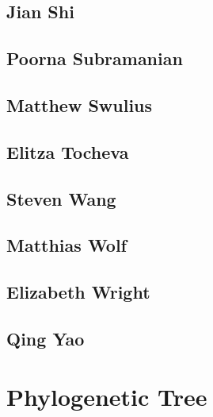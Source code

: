 \documentclass[]{tufte-book}
\begin{document}
\hypertarget{jian_shi}{\section{Jian Shi}\label{jian_shi}}

\hypertarget{poorna_subramanian}{\section{Poorna
Subramanian}\label{poorna_subramanian}}

\hypertarget{matthew_swulius}{\section{Matthew
Swulius}\label{matthew_swulius}}

\hypertarget{elitza_tocheva}{\section{Elitza
Tocheva}\label{elitza_tocheva}}

\hypertarget{steven_wang}{\section{Steven Wang}\label{steven_wang}}

\section{Matthias Wolf}\label{matthias_wolf}

\hypertarget{elizabeth_wright}{\section{Elizabeth
Wright}\label{elizabeth_wright}}

\hypertarget{qing_yao}{\section{Qing Yao}\label{qing_yao}}

\chapter{Phylogenetic Tree}\label{phylogenetic-tree}
\end{document}
